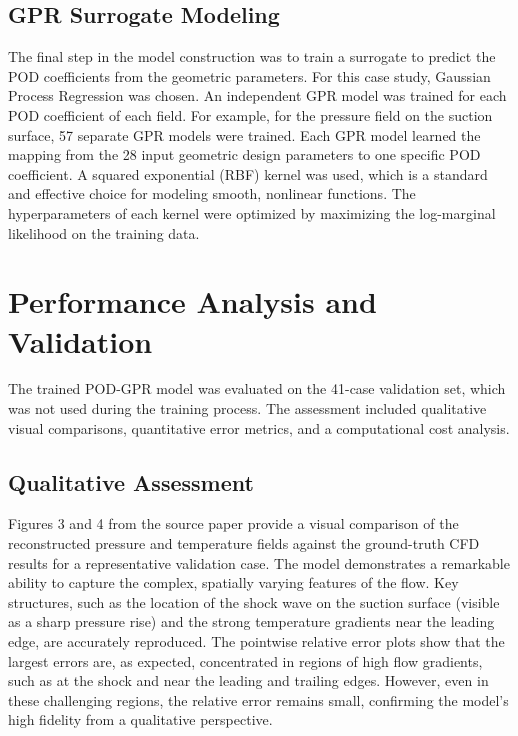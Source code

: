 \documentclass[dscexam, EN]{ufabcFHZh}
\begin{document}
\subsection{GPR Surrogate Modeling}

The final step in the model construction was to train a surrogate to predict the POD coefficients from the geometric parameters. For this case study, Gaussian Process Regression was chosen. An independent GPR model was trained for each POD coefficient of each field. For example, for the pressure field on the suction surface, 57 separate GPR models were trained. Each GPR model learned the mapping from the 28 input geometric design parameters to one specific POD coefficient. A squared exponential (RBF) kernel was used, which is a standard and effective choice for modeling smooth, nonlinear functions. The hyperparameters of each kernel were optimized by maximizing the log-marginal likelihood on the training data.  

\section{Performance Analysis and Validation}

The trained POD-GPR model was evaluated on the 41-case validation set, which was not used during the training process. The assessment included qualitative visual comparisons, quantitative error metrics, and a computational cost analysis.


\subsection{Qualitative Assessment}

Figures 3 and 4 from the source paper  provide a visual comparison of the reconstructed pressure and temperature fields against the ground-truth CFD results for a representative validation case. The model demonstrates a remarkable ability to capture the complex, spatially varying features of the flow. Key structures, such as the location of the shock wave on the suction surface (visible as a sharp pressure rise) and the strong temperature gradients near the leading edge, are accurately reproduced. The pointwise relative error plots show that the largest errors are, as expected, concentrated in regions of high flow gradients, such as at the shock and near the leading and trailing edges. However, even in these challenging regions, the relative error remains small, confirming the model's high fidelity from a qualitative perspective. 
\end{document}
